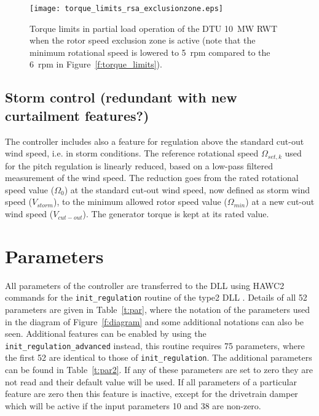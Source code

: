 \begin{figure}[tb]
\centerline{
\texttt{[image: torque\_limits\_rsa\_exclusionzone.eps]} }
\caption{Torque limits in partial load operation of the DTU 10~MW RWT when the rotor speed exclusion zone is active (note that the minimum rotational speed is lowered to 5~rpm compared to the 6~rpm in Figure~\ref{f:torque_limits}). \label{f:EZ_torque_limits}}
\end{figure}


\subsection{Storm control (redundant with new curtailment features?)}

The controller includes also a feature for regulation above the standard cut-out wind speed, i.e. in storm conditions. The reference rotational speed $\Omega_{set, k}$ used for the pitch regulation is linearly reduced, based on a low-pass filtered measurement of the wind speed. The reduction goes from the rated rotational speed value ($\Omega_0$) at the standard cut-out wind speed, now defined as storm wind speed ($V_{storm}$), to the minimum allowed rotor speed value ($\Omega_{min}$) at a new cut-out wind speed ($V_{cut-out}$). The generator torque is kept at its rated value.

\clearpage

\section{Parameters}
\label{s:par}

All parameters of the controller are transferred to the DLL using HAWC2 commands for the \verb|init_regulation| routine of the type2 DLL \cite{Larsen12}. Details of all 52 parameters are given in Table~\ref{t:par}, where the notation of the parameters used in the diagram of Figure~\ref{f:diagram} and some additional notations can also be seen. Additional features can be enabled by using the \verb|init_regulation_advanced| instead, this routine requires 75 parameters, where the first 52 are identical to those of \verb|init_regulation|. The additional parameters can be found in Table~\ref{t:par2}. If any of these parameters are set to zero they are not read and their default value will be used. If all parameters of a particular feature are zero then this feature is inactive, except for the drivetrain damper which will be active if the input parameters 10 and 38 are non-zero.

